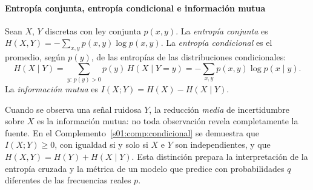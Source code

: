\paragraph{Entropía conjunta, entropía condicional e información mutua}
\begin{definicion}\label{s01:def:condicional}
Sean $X$, $Y$ discretas con ley conjunta $p(x,y)$. La \emph{entropía conjunta} es
$H(X,Y)=-\sum_{x,y}p(x,y)\log p(x,y)$. La \emph{entropía condicional} es el
promedio, según $p(y)$, de las entropías de las distribuciones condicionales:
\[
H(X\mid Y)=\sum_{y:\,p(y)>0}p(y)\,H(X\mid Y=y)=-\sum_{x,y}p(x,y)\log p(x\mid y).
\]
La \emph{información mutua} es $I(X;Y)=H(X)-H(X\mid Y)$.
\end{definicion}
Cuando se observa una señal ruidosa $Y$, la reducción \emph{media} de
incertidumbre sobre $X$ es la información mutua: no toda observación revela
completamente la fuente. En el Complemento~\ref{s01:comp:condicional} se demuestra
que $I(X;Y)\ge0$, con igualdad si y solo si $X$ e $Y$ son independientes, y que
$H(X,Y)=H(Y)+H(X\mid Y)$. Esta distinción prepara la interpretación de la entropía
cruzada y la métrica de un modelo que predice con probabilidades $q$ diferentes de
las frecuencias reales $p$.
